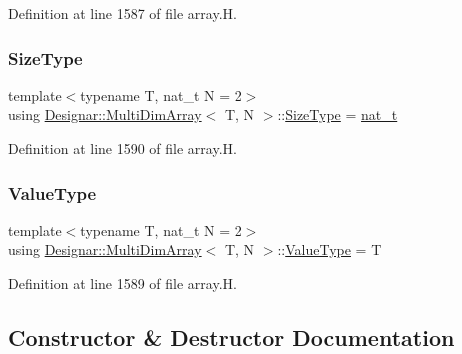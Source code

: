 Definition at line 1587 of file array.\+H.

\mbox{\label{class_designar_1_1_multi_dim_array_a45c10514739f65d38ae3749569739267}} 
\subsubsection{\texorpdfstring{Size\+Type}{SizeType}}
{\footnotesize\ttfamily template$<$typename T, nat\+\_\+t N = 2$>$ \\
using \hyperlink{class_designar_1_1_multi_dim_array}{Designar\+::\+Multi\+Dim\+Array}$<$ T, N $>$\+::\hyperlink{class_designar_1_1_multi_dim_array_a45c10514739f65d38ae3749569739267}{Size\+Type} =  \hyperlink{namespace_designar_aa72662848b9f4815e7bf31a7cf3e33d1}{nat\+\_\+t}}



Definition at line 1590 of file array.\+H.

\mbox{\label{class_designar_1_1_multi_dim_array_aecea28d754897523cdfa68bc28b829d3}} 
\subsubsection{\texorpdfstring{Value\+Type}{ValueType}}
{\footnotesize\ttfamily template$<$typename T, nat\+\_\+t N = 2$>$ \\
using \hyperlink{class_designar_1_1_multi_dim_array}{Designar\+::\+Multi\+Dim\+Array}$<$ T, N $>$\+::\hyperlink{class_designar_1_1_multi_dim_array_aecea28d754897523cdfa68bc28b829d3}{Value\+Type} =  T}



Definition at line 1589 of file array.\+H.



\subsection{Constructor \& Destructor Documentation}
\mbox{\label{class_designar_1_1_multi_dim_array_a52a96f1eeb1176cc18d6329ab75e59f8}} 
